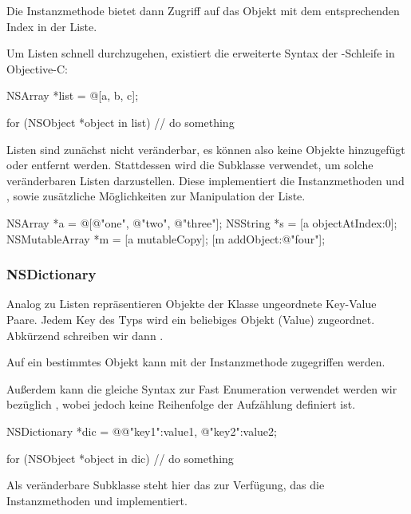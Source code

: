 \documentclass[parskip=half, final]{scrreprt}
\begin{document}
Die Instanzmethode  bietet dann Zugriff auf das Objekt mit dem entsprechenden Index in der Liste.

Um Listen schnell durchzugehen, existiert die erweiterte  Syntax der -Schleife in Objective-C:
\begin{objclst}
NSArray *list = @[a, b, c];

for (NSObject *object in list) {
    // do something
}
\end{objclst}

Listen sind zunächst nicht veränderbar, es können also keine Objekte hinzugefügt oder entfernt werden. Stattdessen wird die Subklasse  verwendet, um solche veränderbaren Listen darzustellen. Diese implementiert die Instanzmethoden  und , sowie zusätzliche Möglichkeiten zur Manipulation der Liste.

\begin{objclst}
NSArray *a = @[@"one", @"two", @"three"];
NSString *s = [a objectAtIndex:0];
NSMutableArray *m = [a mutableCopy];
[m addObject:@"four"];
\end{objclst}


\subsubsection{NSDictionary}

Analog zu Listen repräsentieren Objekte der Klasse  ungeordnete Key-Value Paare. Jedem Key des Typs  wird ein beliebiges Objekt (Value) zugeordnet. Abkürzend schreiben wir dann .

Auf ein bestimmtes Objekt kann mit der Instanzmethode  zugegriffen werden.

Außerdem kann die gleiche Syntax zur Fast Enumeration verwendet werden wir bezüglich , wobei jedoch keine Reihenfolge der Aufzählung definiert ist.

\begin{objclst}
NSDictionary *dic = @{@"key1":value1, @"key2":value2};

for (NSObject *object in dic) {
    // do something
}
\end{objclst}

Als veränderbare Subklasse steht hier das  zur Verfügung, das die Instanzmethoden  und  implementiert.
\end{document}
